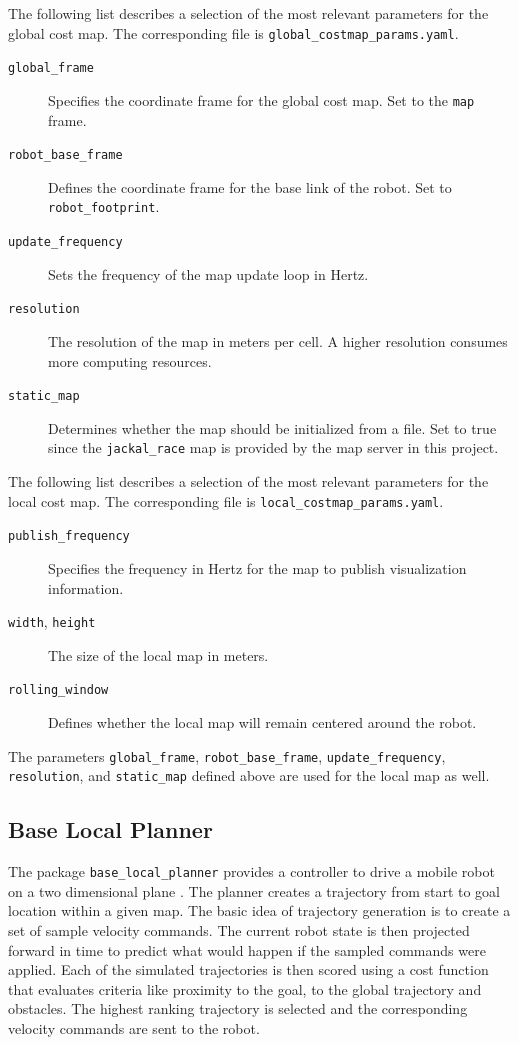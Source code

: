 \documentclass[10pt,journal,compsoc]{IEEEtran}
\begin{document}
The following list describes a selection of the most relevant parameters for the global cost map. The corresponding file is \texttt{global\_costmap\_params.yaml}.
\begin{description}
\item[\texttt{global\_frame}] Specifies the coordinate frame for the global cost map. Set to the \texttt{map} frame.
\item[\texttt{robot\_base\_frame}] Defines the coordinate frame for the base link of the robot. Set to \texttt{robot\_footprint}.
\item[\texttt{update\_frequency}] Sets the frequency of the map update loop in Hertz.
\item[\texttt{resolution}] The resolution of the map in meters per cell. A higher resolution consumes more computing resources.
\item[\texttt{static\_map}] Determines whether the map should be initialized from a file. Set to true since the \texttt{jackal\_race} map is provided by the map server in this project.
\end{description}

The following list describes a selection of the most relevant parameters for the local cost map. The corresponding file is \texttt{local\_costmap\_params.yaml}.
\begin{description}
\item[\texttt{publish\_frequency}] Specifies the frequency in Hertz for the map to publish visualization information.
\item[\texttt{width}, \texttt{height}] The size of the local map in meters.
\item[\texttt{rolling\_window}] Defines whether the local map will remain centered around the robot.
\end{description}
The parameters \texttt{global\_frame}, \texttt{robot\_base\_frame}, \texttt{update\_frequency}, \texttt{resolution}, and \texttt{static\_map} defined above are used for the local map as well.

\subsection{Base Local Planner}
The package \texttt{base\_local\_planner} provides a controller to drive a mobile robot on a two dimensional plane \cite{ros_wiki_base_local_planner}. The planner creates a trajectory from start to goal location within a given map. The basic idea of trajectory generation is to create a set of sample velocity commands. The current robot state is then projected forward in time to predict what would happen if the sampled commands were applied. Each of the simulated trajectories is then scored using a cost function that evaluates criteria like proximity to the goal, to the global trajectory and obstacles. The highest ranking trajectory is selected and the corresponding velocity commands are sent to the robot.
\end{document}
